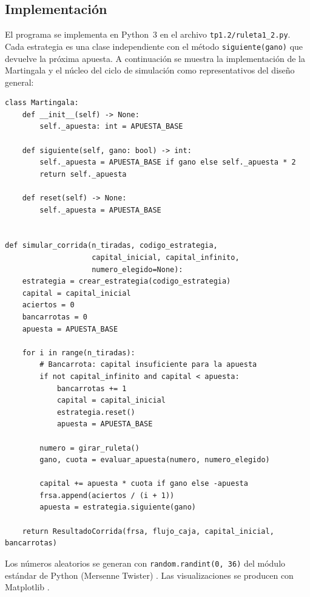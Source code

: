 \documentclass[a4paper, 11pt]{article}
\begin{document}
\subsection{Implementación}

El programa se implementa en Python~3 en el archivo
\texttt{tp1.2/ruleta1\_2.py}. Cada estrategia es una clase independiente
con el método \texttt{siguiente(gano)} que devuelve la próxima apuesta.
A continuación se muestra la implementación de la Martingala y el núcleo
del ciclo de simulación como representativos del diseño general:

\begin{lstlisting}[style=python, caption={Clase Martingala y ciclo principal de simulación.}]
class Martingala:
    def __init__(self) -> None:
        self._apuesta: int = APUESTA_BASE

    def siguiente(self, gano: bool) -> int:
        self._apuesta = APUESTA_BASE if gano else self._apuesta * 2
        return self._apuesta

    def reset(self) -> None:
        self._apuesta = APUESTA_BASE


def simular_corrida(n_tiradas, codigo_estrategia,
                    capital_inicial, capital_infinito,
                    numero_elegido=None):
    estrategia = crear_estrategia(codigo_estrategia)
    capital = capital_inicial
    aciertos = 0
    bancarrotas = 0
    apuesta = APUESTA_BASE

    for i in range(n_tiradas):
        # Bancarrota: capital insuficiente para la apuesta
        if not capital_infinito and capital < apuesta:
            bancarrotas += 1
            capital = capital_inicial
            estrategia.reset()
            apuesta = APUESTA_BASE

        numero = girar_ruleta()
        gano, cuota = evaluar_apuesta(numero, numero_elegido)

        capital += apuesta * cuota if gano else -apuesta
        frsa.append(aciertos / (i + 1))
        apuesta = estrategia.siguiente(gano)

    return ResultadoCorrida(frsa, flujo_caja, capital_inicial, bancarrotas)
\end{lstlisting}

Los números aleatorios se generan con \texttt{random.randint(0, 36)}
del módulo estándar de Python (Mersenne Twister) \cite{python_random}.
Las visualizaciones se producen con Matplotlib \cite{matplotlib2007}.

\end{document}
